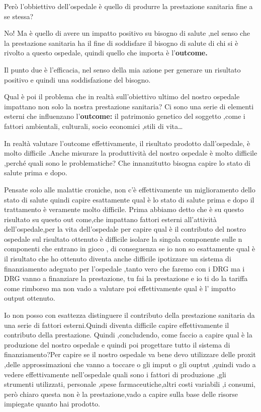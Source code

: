 Però l'obbiettivo dell'ospedale è quello di produrre la prestazione
sanitaria fine a se stessa?

No! Ma è quello di avere un impatto positivo su bisogno di salute ,nel
senso che la prestazione sanitaria ha il fine di soddisfare il bisogno
di salute di chi si è rivolto a questo ospedale, quindi quello che
importa è l'\textbf{outcome.}

Il punto due è l'efficacia, nel senso della mia azione per generare un
risultato positivo e quindi una soddisfazione del bisogno.

Qual è poi il problema che in realtà sull'obiettivo ultimo del nostro
ospedale impattano non solo la nostra prestazione sanitaria? Ci sono una
serie di elementi esterni che influenzano l'\textbf{outcome:} il
patrimonio genetico del soggetto ,come i fattori ambientali, culturali,
socio economici ,stili di vita\ldots{}

In realtà valutare l'outcome effettivamente, il risultato prodotto
dall'ospedale, è molto difficile .Anche misurare la produttività del
nostro ospedale è molto difficile ,perché quali sono le problematiche?
Che innanzitutto bisogna capire lo stato di salute prima e dopo.

Pensate solo alle malattie croniche, non c'è effettivamente un
miglioramento dello stato di salute quindi capire esattamente qual è lo
stato di salute prima e dopo il trattamento è veramente molto difficile.
Prima abbiamo detto che è su questo risultato su questo out come,che
impattano fattori esterni all'attività dell'ospedale,per la vita
dell'ospedale per capire qual è il contributo del nostro ospedale sul
risultato ottenuto è difficile isolare la singola componente sulle n
componenti che entrano in gioco , di conseguenza se io non so
esattamente qual è il risultato che ho ottenuto diventa anche difficile
ipotizzare un sistema di finanziamento adeguato per l'ospedale ,tanto
vero che faremo con i DRG ma i DRG vanno a finanziare la prestazione, tu
fai la prestazione e io ti do la tariffa come rimborso ma non vado a
valutare poi effettivamente qual è l' impatto output ottenuto.

Io non posso con esattezza distinguere il contributo della prestazione
sanitaria da una serie di fattori esterni.Quindi diventa difficile
capire effettivamente il contributo della prestazione. Quindi
,concludendo, come faccio a capire qual è la produzione del nostro
ospedale e quindi poi progettare tutto il sistema di finanziamento?Per
capire se il nostro ospedale va bene devo utilizzare delle proxit ,delle
approssimazioni che vanno a toccare o gli imput o gli ouptut ,quindi
vado a vedere effettivamente nell'ospedale quali sono i fattori di
produzione ,gli strumenti utilizzati, personale ,spese
farmaceutiche,altri costi variabili ,i consumi, però chiaro questa non è
la prestazione,vado a capire sulla base delle risorse impiegate quanto
hai prodotto.

